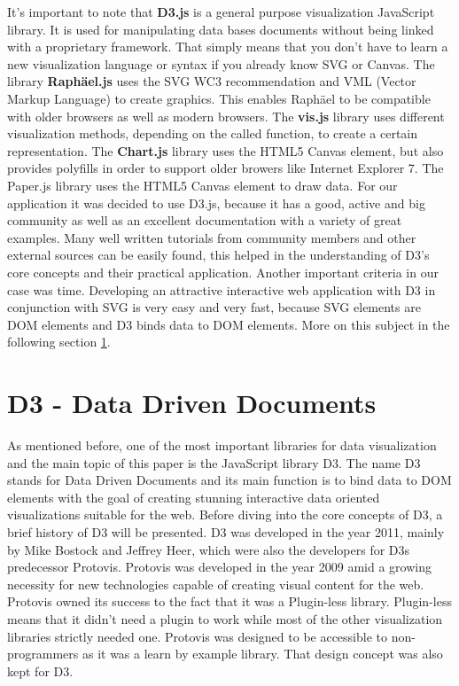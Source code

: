 \documentclass{bioinfo}
\begin{document}
It's important to note that \textbf{D3.js} is a general purpose visualization JavaScript library. It is used for manipulating data bases documents without being linked with a proprietary framework.
That simply means that you don't have to learn a new visualization language or syntax if you already know SVG or Canvas.
\newline
The library \textbf{Raph\"ael.js} uses the SVG WC3 recommendation and VML (Vector Markup Language) to create graphics. This enables Raph\"ael to be compatible with older browsers as well as modern browsers.
\newline
The \textbf{vis.js} library uses different visualization methods, depending on the called function, to create a certain representation.
\newline
The \textbf{Chart.js} library uses the HTML5 Canvas element, but also provides polyfills in order to support older browers like Internet Explorer 7.
\newline
The Paper.js library uses the HTML5 Canvas element to draw data.
\newline
For our application it was decided to use D3.js, because it has a good, active and big community as well as an excellent documentation with a variety of great examples.
Many well written tutorials from community members and other external sources can be easily found, this helped in the understanding of D3's core concepts and their practical application.
Another important criteria in our case was time. Developing an attractive interactive web application with D3 in conjunction with SVG is very easy and very fast, because SVG elements are DOM elements and D3 binds data to DOM elements. More on this subject in the following section \ref{s:d3}.



\section{D3 - Data Driven Documents} \label{s:d3}
As mentioned before, one of the most important libraries for data visualization and the main topic of this paper is the JavaScript library D3. The name D3 stands for Data Driven Documents and its main function is to bind data to DOM elements with the goal of creating stunning interactive data oriented visualizations suitable for the web.
\newline
Before diving into the core concepts of D3, a brief history of D3 will be presented.
D3 was developed in the year 2011, mainly by Mike Bostock and Jeffrey Heer, which were also the developers for D3s predecessor Protovis.
\newline
Protovis was developed in the year 2009 amid a growing necessity for new technologies capable of creating visual content for the web. Protovis owned its success to the fact that it was a Plugin-less library. Plugin-less means that it didn’t need a plugin to work while most of the other visualization libraries strictly needed one. Protovis was designed to be accessible to non-programmers as it was a learn by example library.
That design concept was also kept for D3.
\end{document}
